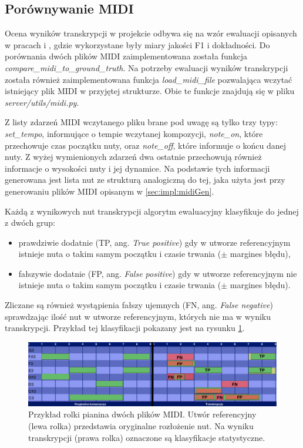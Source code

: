 \documentclass[12pt,a4paper,twoside]{mwart}
\begin{document}
\subsection{Porównywanie MIDI}\label{sec:impl:midiCompare}
Ocena wyników transkrypcji w projekcie odbywa się na wzór ewaluacji opisanych w pracach 
\cite[107]{Transcription:Pertus:Inharmonicity} 
i 
\cite[8]{Transcription:Pertus:Inharmonicity2}
, gdzie wykorzystane były miary jakości F1 i dokładności. Do porównania dwóch plików MIDI zaimplementowana została funkcja \textit{compare\_midi\_to\_ground\_truth}. Na potrzeby ewaluacji wyników transkrypcji została również zaimplementowana funkcja \textit{load\_midi\_file} pozwalająca wczytać istniejący plik MIDI w przyjętej strukturze. Obie te funkcje znajdują się w pliku \textit{server/utils/midi.py}.

Z listy zdarzeń MIDI wczytanego pliku brane pod uwagę są tylko trzy typy: \textit{set\_tempo}, informujące o tempie wczytanej kompozycji, \textit{note\_on}, które przechowuje czas początku nuty, oraz \textit{note\_off}, które informuje o końcu danej nuty. Z wyżej wymienionych zdarzeń dwa ostatnie przechowują również informacje o wysokości nuty i jej dynamice. Na podstawie tych informacji generowana jest lista nut ze strukturą analogiczną do tej, jaka użyta jest przy generowaniu plików MIDI opisanym w \ref{sec:impl:midiGen}.

Każdą z wynikowych nut transkrypcji algorytm ewaluacyjny klasyfikuje do jednej z dwóch grup:
\begin{itemize}
  \item prawdziwie dodatnie (TP, ang. \textit{True positive}) gdy w utworze referencyjnym istnieje nuta o takim samym początku i czasie trwania ($\pm$ margines błędu),
  \item fałszywie dodatnie (FP, ang. \textit{False positive}) gdy w utworze referencyjnym nie istnieje nuta o takim samym początku i czasie trwania ($\pm$ margines błędu).
\end{itemize} 
Zliczane są również wystąpienia fałszy ujemnych (FN, ang. \textit{False negative}) sprawdzając ilość nut w utworze referencyjnym, których nie ma w wyniku transkrypcji. Przykład tej klasyfikacji pokazany jest na rysunku \ref{fig:f1}.

\begin{figure}[H]
  \begin{center}
    \includegraphics[scale=0.21]{images/TranscriptionStatisticF1Measure.jpg}
    \caption{Przykład rolki pianina dwóch plików MIDI. Utwór referencyjny (lewa rolka) przedstawia oryginalne rozłożenie nut. Na wyniku transkrypcji (prawa rolka) oznaczone są klasyfikacje statystyczne.}
    \label{fig:f1}
  \end{center}
\end{figure}
\end{document}
